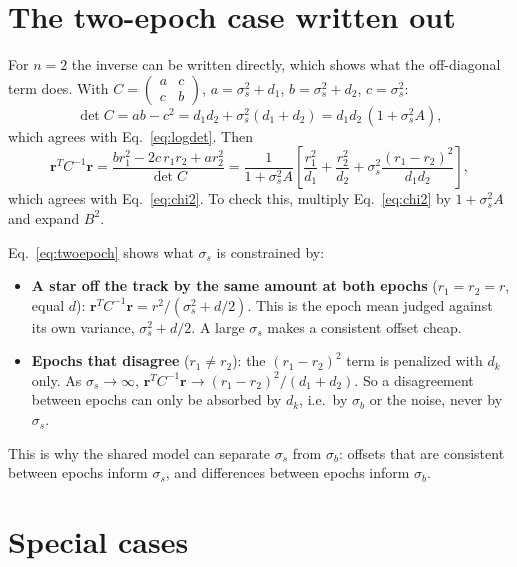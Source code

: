 \documentclass[11pt]{article}
\newcommand{\br}{\mathbf{r}}
\begin{document}
\section{The two-epoch case written out}
For $n=2$ the inverse can be written directly, which shows what the off-diagonal term does.
With $C = \begin{pmatrix} a & c \\ c & b \end{pmatrix}$, $a = \sigma_s^2 + d_1$, $b = \sigma_s^2 + d_2$, $c = \sigma_s^2$:
\begin{equation*}
  \det C = ab - c^2 = d_1 d_2 + \sigma_s^2(d_1 + d_2) = d_1 d_2\,(1 + \sigma_s^2 A),
\end{equation*}
which agrees with Eq.~\eqref{eq:logdet}. Then
\begin{equation}
  \br^T C^{-1}\br = \frac{b r_1^2 - 2c\,r_1 r_2 + a r_2^2}{\det C}
  = \frac{1}{1 + \sigma_s^2 A}\left[\frac{r_1^2}{d_1} + \frac{r_2^2}{d_2} + \sigma_s^2\frac{(r_1 - r_2)^2}{d_1 d_2}\right],
  \label{eq:twoepoch}
\end{equation}
which agrees with Eq.~\eqref{eq:chi2}.
To check this, multiply Eq.~\eqref{eq:chi2} by $1 + \sigma_s^2A$ and expand $B^2$.

Eq.~\eqref{eq:twoepoch} shows what $\sigma_s$ is constrained by:
\begin{itemize}
  \item \textbf{A star off the track by the same amount at both epochs} ($r_1 = r_2 = r$, equal $d$):
        $\br^TC^{-1}\br = r^2/(\sigma_s^2 + d/2)$.
        This is the epoch mean judged against its own variance, $\sigma_s^2 + d/2$.
        A large $\sigma_s$ makes a consistent offset cheap.
  \item \textbf{Epochs that disagree} ($r_1 \neq r_2$): the $(r_1 - r_2)^2$ term is penalized with $d_k$ only.
        As $\sigma_s\to\infty$, $\br^TC^{-1}\br \to (r_1 - r_2)^2/(d_1 + d_2)$.
        So a disagreement between epochs can only be absorbed by $d_k$, i.e.\ by $\sigma_b$ or the noise, never by $\sigma_s$.
\end{itemize}
This is why the shared model can separate $\sigma_s$ from $\sigma_b$:
offsets that are consistent between epochs inform $\sigma_s$, and differences between epochs inform $\sigma_b$.

\section{Special cases}
\end{document}
